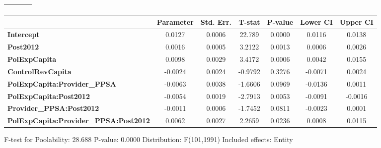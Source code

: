 \begin{center}
\begin{tabular}{lclc}
\textbf{}                                     &                    & \textbf{                     }   &                  \\
\bottomrule
\end{tabular}
\begin{tabular}{lcccccc}
                                              & \textbf{Parameter} & \textbf{Std. Err.} & \textbf{T-stat} & \textbf{P-value} & \textbf{Lower CI} & \textbf{Upper CI}  \\
\midrule
\textbf{Intercept}                            &       0.0127       &       0.0006       &      22.789     &      0.0000      &       0.0116      &       0.0138       \\
\textbf{Post2012}                             &       0.0016       &       0.0005       &      3.2122     &      0.0013      &       0.0006      &       0.0026       \\
\textbf{PolExpCapita}                         &       0.0098       &       0.0029       &      3.4172     &      0.0006      &       0.0042      &       0.0155       \\
\textbf{ControlRevCapita}                     &      -0.0024       &       0.0024       &     -0.9792     &      0.3276      &      -0.0071      &       0.0024       \\
\textbf{PolExpCapita:Provider\_PPSA}          &      -0.0063       &       0.0038       &     -1.6606     &      0.0969      &      -0.0136      &       0.0011       \\
\textbf{PolExpCapita:Post2012}                &      -0.0054       &       0.0019       &     -2.7913     &      0.0053      &      -0.0091      &      -0.0016       \\
\textbf{Provider\_PPSA:Post2012}              &      -0.0011       &       0.0006       &     -1.7452     &      0.0811      &      -0.0023      &       0.0001       \\
\textbf{PolExpCapita:Provider\_PPSA:Post2012} &       0.0062       &       0.0027       &      2.2659     &      0.0236      &       0.0008      &       0.0115       \\
\bottomrule
\end{tabular}
\end{center}

F-test for Poolability: 28.688 \newline
 P-value: 0.0000 \newline
 Distribution: F(101,1991) \newline
  \newline
 Included effects: Entity